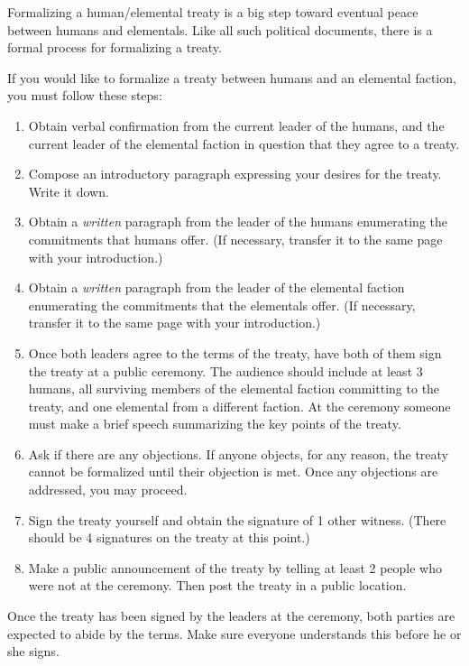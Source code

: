 \documentclass[green]{elementals}
\begin{document}
\name{\gTreaty{}}

Formalizing a human/elemental treaty is a big step toward eventual peace between humans and elementals. Like all such political documents, there is a formal process for formalizing a treaty.

If you would like to formalize a treaty between humans and an elemental faction, you must follow these steps:
\begin{enumerate}
  \item Obtain verbal confirmation from the current leader of the humans, and the current leader of the elemental faction in question that they agree to a treaty.
  \item Compose an introductory paragraph expressing your desires for the treaty.  Write it down.
  \item Obtain a \emph{written} paragraph from the leader of the humans enumerating the commitments that humans offer. (If necessary, transfer it to the same page with your introduction.)
  \item Obtain a \emph{written} paragraph from the leader of the elemental faction enumerating the commitments that the elementals offer. (If necessary, transfer it to the same page with your introduction.)
  \item Once both leaders agree to the terms of the treaty, have both of them sign the treaty at a public ceremony.  The audience should include at least 3 humans, all surviving members of the elemental faction committing to the treaty, and one elemental from a different faction. At the ceremony someone must make a brief speech summarizing the key points of the treaty. 
  \item Ask if there are any objections. If anyone objects, for any reason, the treaty cannot be formalized until their objection is met. Once any objections are addressed, you may proceed.
  \item Sign the treaty yourself and obtain the signature of 1 other witness. (There should be 4 signatures on the treaty at this point.)
  \item Make a public announcement of the treaty by telling at least 2 people who were not at the ceremony.  Then post the treaty in a public location.
\end{enumerate}

Once the treaty has been signed by the leaders at the ceremony, both parties are expected to abide by the terms. Make sure everyone understands this before he or she signs.
\end{document}
